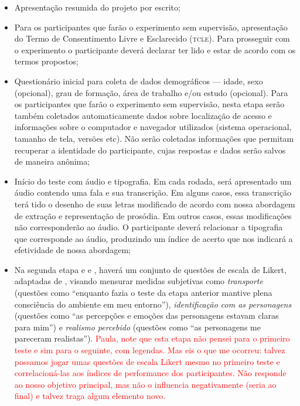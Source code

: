 \documentclass[a4paper,11pt,titlepage,singlespacing]{article}
\newcommand\todo[1]{\textcolor{red}{#1}}
\begin{document}
\begin{itemize}
    \item Apresentação resumida do projeto por escrito;
    \item Para os participantes que farão o experimento sem supervisão, apresentação do Termo de Consentimento Livre e Esclarecido (\textsc{tcle}). Para prosseguir com o experimento o participante deverá declarar ter lido e estar de acordo com os termos propostos;
    \item Questionário inicial para coleta de dados demográficos — idade, sexo (opcional), grau de formação, área de trabalho e/ou estudo (opcional). Para os participantes que farão o experimento sem supervisão, nesta etapa serão também coletados automaticamente dados sobre localização de acesso e informações sobre o computador e navegador utilizados (sistema operacional, tamanho de tela, versões etc). Não serão coletadas informações que permitam recuperar a identidade do participante, cujas respostas e dados serão salvos de maneira anônima; 
    \item Início do teste com áudio e tipografia. Em cada rodada, será apresentado um áudio contendo uma fala e sua transcrição. Em alguns casos, essa transcrição terá tido o desenho de suas letras modificado de acordo com nossa abordagem de extração e representação de prosódia. Em outros casos, essas modificações não corresponderão ao áudio. O participante deverá relacionar a tipografia que corresponde ao áudio, produzindo um índice de acerto que nos indicará a efetividade de nossa abordagem;
    \item Na segunda etapa e  e , haverá um conjunto de questões de escala de Likert, adaptadas de \cite{translatology}, visando mensurar medidas subjetivas como \textit{transporte} (questões como “enquanto fazia o teste da etapa anterior mantive plena consciência do ambiente em meu entorno”), \textit{identificação com as personagens} (questões como “as percepções e emoções das personagens estavam claras para mim”) e \textit{realismo percebido} (questões como “as personagens me pareceram realistas”). \todo{Paula, note que esta etapa não pensei para o primeiro teste e sim para o seguinte, com legendas. Mas eis o que me ocorreu: talvez possamos jogar umas questões de escala Likert mesmo no primeiro teste e correlacioná-las aos índices de performance dos participantes. Não responde ao nosso objetivo principal, mas não o influencia negativamente (seria ao final) e talvez traga algum elemento novo.}
\end{itemize}
\end{document}
